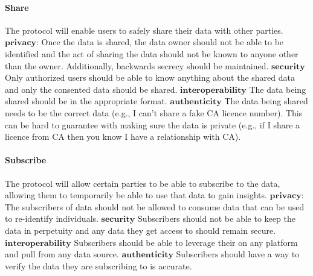 \paragraph{Share}
The protocol will enable users to safely share their data with other parties. 
\newline
$\mathbf{privacy}$:
Once the data is shared, the data owner should not be able to be identified and the act of sharing the data should not be known to anyone other than the owner. Additionally, backwards secrecy should be maintained.
\newline
$\mathbf{security}$
Only authorized users should be able to know anything about the shared data and only the consented data should be shared.
\newline
$\mathbf{interoperability}$
The data being shared should be in the appropriate format. 
\newline
$\mathbf{authenticity}$
The data being shared needs to be the correct data (e.g., I can't share a fake CA licence number). This can be hard to guarantee with making sure the data is private (e.g., if I share a licence from CA then you know I have a relationship with CA).
\paragraph{Subscribe}
The protocol will allow certain parties to be able to subscribe to the data, allowing them to temporarily be able to use that data to gain insights. 
\newline
$\mathbf{privacy}$:
The subscribers of data should not be allowed to consume data that can be used to re-identify individuals. 
\newline
$\mathbf{security}$
Subscribers should not be able to keep the data in perpetuity and any data they get access to should remain secure.
\newline
$\mathbf{interoperability}$
Subscribers should be able to leverage their on any platform and pull from any data source.
\newline
$\mathbf{authenticity}$
Subscribers should have a way to verify the data they are subscribing to is accurate.